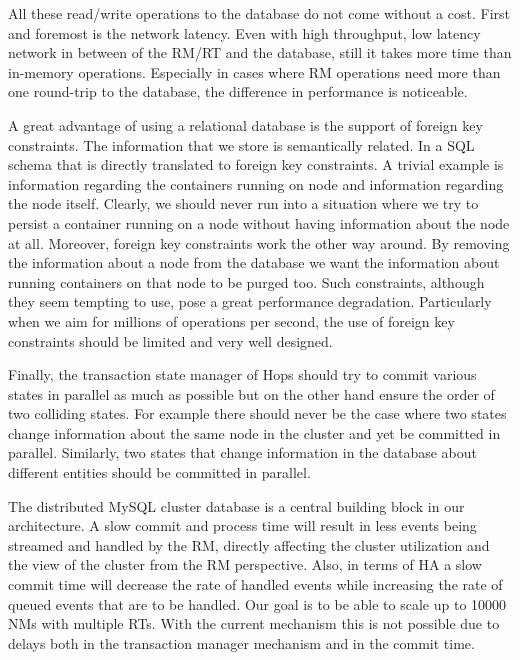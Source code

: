 All these read/write operations to the database do not come without
a cost. First and foremost is the network latency. Even with high
throughput, low latency network in between of the RM/RT and the database, still
it takes more time than in-memory operations. Especially in cases
where RM operations need more than one round-trip to the database, the
difference in performance is noticeable.

A great advantage of using a relational database is the support of
foreign key constraints. The information that we store is semantically
related. In a SQL schema that is directly translated to foreign key
constraints. A trivial example is information regarding the containers
running on node and information regarding the node itself. Clearly, we
should never run into a situation where we try to persist a container
running on a node without having information about the node at
all. Moreover, foreign key constraints work the other way around. By
removing the information about a node from the database we want the
information about running containers on that node to be purged
too. Such constraints, although they seem tempting to use, pose a
great performance degradation. Particularly when we aim for millions
of operations per second, the use of foreign key constraints should be
limited and very well designed.

Finally, the transaction state manager of Hops should try to commit
various states in parallel as much as possible but on the other hand
ensure the order of two colliding states. For example there should
never be the case where two states change information about the same
node in the cluster and yet be committed in parallel. Similarly, two
states that change information in the database about different
entities should be committed in parallel.

The distributed MySQL cluster database is a central building block in our
architecture. A slow commit and process time will result in less events being
streamed and handled by the RM, directly affecting the cluster
utilization and the view of the cluster from the RM perspective.
Also, in terms of HA a slow commit time will decrease the
rate of handled events while increasing the rate of queued events that
are to be handled. Our goal is to be able to scale up to 10000 NMs
with multiple RTs. With the current mechanism this is not possible due
to delays both in the transaction manager mechanism and in the commit
time.